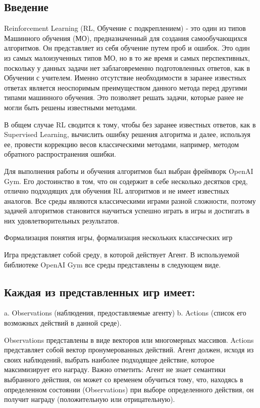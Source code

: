 \subsection*{Введение}

Reinforcement Learning (RL, Обучение с подкреплением) - это один из типов Машинного обучения (МО), предназначенный для создания самообучающихся алгоритмов. Он представляет из себя обучение путем проб и ошибок. Это один из самых малоизученных типов МО, но в то же время и самых перспективных, поскольку у данных задачи нет заблаговременно подготовленных ответов, как в Обучении с учителем. Именно отсутствие необходимости в заранее известных ответах является неоспоримым преимуществом данного метода перед другими типами машинного обучения. Это позволяет решать задачи, которые ранее не могли быть решены известными методами.

В общем случае RL сводится к тому, чтобы без заранее известных ответов, как в Supervised Learning, вычислить ошибку решения алгоритма и далее, используя ее, провести коррекцию весов классическими методами, например, методом обратного распространения ошибки.

Для выполнения работы и обучения алгоритмов был выбран фреймворк OpenAI Gym. Его достоинство в том, что он содержит в себе несколько десятков сред, отлично подходящих для обучения RL алгоритмов и не имеет известных аналогов. Все среды являются классическими играми разной сложности, поэтому задачей алгоритмов становится научиться успешно играть в игры и достигать в них удовлетворительных результатов.

Формализация понятия игры, формализация нескольких классических игр

Игра представляет собой среду, в которой действует Агент. В используемой библиотеке OpenAI Gym все среды представлены в следующем виде.

\subsection*{Каждая из представленных игр имеет:}

a. Observations (наблюдения, предоставляемые агенту)
b. Actions (список его возможных действий в данной среде).
 
Observations представлены в виде векторов или многомерных массивов. Actions представляет собой вектор пронумерованных действий. Агент должен, исходя из своих наблюдений, выбрать наиболее подходящее действие, которое максимизирует его награду. Важно отметить: Агент не знает семантики выбранного действия, он может со временем обучиться тому, что, находясь в определенном состоянии (Observations) при выборе определенного действия, он получит награду (положительную или отрицательную).

